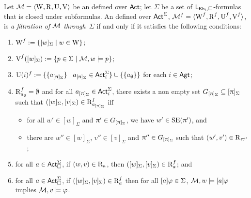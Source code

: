 \begin{definition} \label{def:filtrations}
Let $\mathcal{M} = \langle \operatorname{W},\operatorname{R},\operatorname{U},\operatorname{V} \rangle$ be an \ults defined over ${\rm \sf Act}$; let $\Sigma$ be a set of $\mathsf{L}_{{\sf Kh}_i,\square}$-formulas that is closed under subformulas.
An \ults defined over ${\rm \sf Act}^\Sigma$, $\mathcal{M}^f = \langle \operatorname{W}^f,\operatorname{R}^f,\operatorname{U}^f,\operatorname{V}^f \rangle$, is \emph{a filtration of $\mathcal{M}$ through~$\Sigma$} if and only if it satisfies the following conditions:

\begin{enumerate}
\item $\operatorname{W}^f := \{ [w]_\Sigma \mid w \in \operatorname{W} \}$;
\item $\operatorname{V}^f([w]_\Sigma) := \{ p \in \Sigma \mid \mathcal{M},w\models p \}$;
\item $\operatorname{U}(i)^f := \{ \{ a_{[\uppi]_{\Sigma}} \} \mid a_{[\uppi]_{\Sigma}} \in {\rm \sf Act}^\Sigma_i \} \cup \{ \{ a_\emptyset \} \}$ for each $i \in {\rm \sf Agt}$;
\item \label{item:khiml-fil} $\operatorname{R}^f_{a_\emptyset} = \emptyset$ and for all $a_{[\uppi]_\Sigma} \in {\rm \sf Act}^\Sigma_i$, there exists a non empty set $G_{[\uppi]_\Sigma} \subseteq [\uppi]_\Sigma$ such that $([w]_\Sigma,[v]_\Sigma) \in \operatorname{R}^f_{a_{[\uppi]_\Sigma}}$ iff
\begin{itemize}
\item for all $w' \in [w]_\Sigma$ and $\uppi' \in G_{[\uppi]_\Sigma}$, we have $w' \in \operatorname{SE}(\uppi')$, and
\item there are $w'' \in [w]_\Sigma$, $v'' \in [v]_\Sigma$ and $\uppi'' \in G_{[\uppi]_\Sigma}$ such that $(w',v') \in \operatorname{R}_{\uppi''}$;
\end{itemize}
\item \label{item:khiml-fil-a1} for all $a \in {\rm \sf Act}^\Sigma_\square$, if $(w,v) \in \operatorname{R}_a$, then $([w]_\Sigma,[v]_\Sigma) \in \operatorname{R}^f_a$; and
\item \label{item:khiml-fil-a2} for all $a \in {\rm \sf Act}^\Sigma_\square$, if $([w]_\Sigma,[v]_\Sigma) \in \operatorname{R}^f_a$ then for all $[a] \varphi \in \Sigma$,  $\mathcal{M},w \models [a]\varphi$ implies $\mathcal{M},v \models \varphi$.
\end{enumerate}
\end{definition}

\medskip

